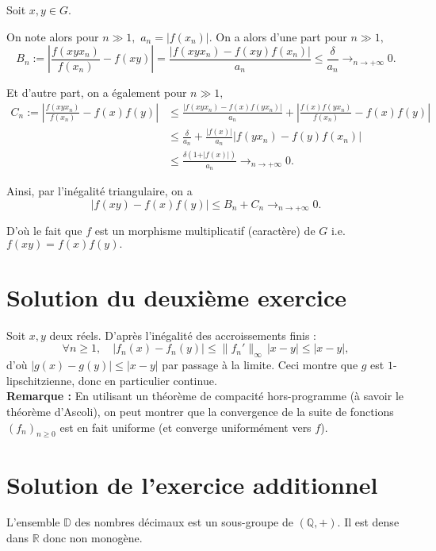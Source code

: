 Soit $x,y\in G.$ 

On note alors pour $n\gg 1,$ $a_{n}=\vert f(x_{n})\vert.$
On a alors d'une part pour $n\gg1,$ $$B_{n}:=\left \vert \frac{f(xyx_{n})}{f(x_{n})}-f(xy) \right\vert =\frac{ \vert f(xyx_{n})-f(xy)f(x_{n}) \vert }{a_{n}}\leq \frac{\delta}{a_{n}}\longrightarrow_{n\rightarrow +\infty} 0.$$

Et d'autre part, on a également pour $n\gg 1,$ 
\begin{align*}
C_{n}:=\left\vert \frac{f(xyx_{n})}{f(x_{n})}-f(x)f(y) \right\vert & \leq \frac{ \vert f(xyx_{n})-f(x)f(yx_{n})\vert }{a_{n}}+ \left\vert \frac{f(x)f(yx_{n})}{f(x_{n})}-f(x)f(y) \right\vert\\
& \leq \frac{\delta}{a_{n}}+ \frac{\vert f(x) \vert }{a_{n}}\vert f(yx_{n})-f(y)f(x_{n})\vert\\
& \leq \frac{\delta(1+\vert f(x) \vert )}{a_{n}}\longrightarrow_{n\rightarrow +\infty} 0.
\end{align*}

Ainsi, par l'inégalité triangulaire, on a $$\vert f(xy)-f(x)f(y)\vert \leq B_{n}+C_{n}\longrightarrow_{n\rightarrow +\infty}0.$$

D'où le fait que $f$ est un morphisme multiplicatif (caractère) de $G$ i.e. $\displaystyle f(xy)=f(x)f(y).$

\section{Solution du deuxième exercice}

Soit $x,y$ deux réels. D'après l'inégalité des accroissements finis :
\[
\forall n \geqslant 1,\quad |f_n(x) - f_n(y)| \leqslant \|f_n'\|_\infty\,|x-y| \leqslant |x-y|,
\]
d'où $|g(x) - g(y)| \leqslant |x-y|$ par passage à la limite. Ceci montre que $g$ est $1$-lipschitzienne, donc en particulier continue.\\

\textbf{Remarque : } En utilisant un théorème de compacité hors-programme (à savoir le théorème d'Ascoli), on peut montrer que la convergence de la suite de fonctions $\displaystyle (f_{n})_{n\geq 0}$ est en fait uniforme (et converge uniformément vers $f$).


\section{Solution de l'exercice additionnel}

L'ensemble $\mathbb D$ des nombres décimaux est un sous-groupe de $(\mathbb Q,+)$. Il est dense dans $\mathbb R$ donc non monogène. 